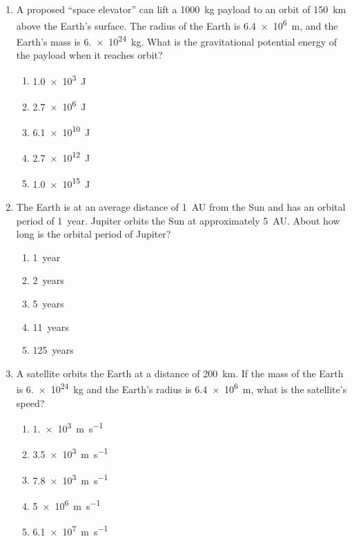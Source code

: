 \documentclass{../../oss-apphys}
\begin{document}
\begin{multicols}{2}
\begin{enumerate}[leftmargin=18pt]
    \columnbreak
    
  \item A proposed ``space elevator'' can lift a \SI{1000}{\kilo\gram} payload
    to an orbit of \SI{150}{\kilo\metre} above the Earth's surface. The radius
    of the Earth is \SI{6.4e6}{\metre}, and the Earth's mass is
    \SI{6.e24}{\kilo\gram}. What is the gravitational potential energy of the
    payload when it reaches orbit?
    \begin{enumerate}[noitemsep,topsep=0pt,leftmargin=18pt,label=(\Alph*)]
    \item\SI{1.0e3}{\joule}
    \item\SI{2.7e6}{\joule}
    \item\SI{6.1e10}{\joule}
    \item\SI{2.7e12}{\joule}
    \item\SI{1.0e15}{\joule}
    \end{enumerate}

  \item The Earth is at an average distance of \SI{1}{AU} from the Sun and has
    an orbital period of \SI{1}{year}. Jupiter orbits the Sun at approximately
    \SI{5}{AU}. About how long is the orbital period of Jupiter?
    \begin{enumerate}[noitemsep,topsep=0pt,leftmargin=18pt,label=(\Alph*)]
    \item\SI{1}{year}
    \item\SI{2}{years}
    \item\SI{5}{years}
    \item\SI{11}{years}
    \item\SI{125}{years}
    \end{enumerate}

  \item A satellite orbits the Earth at a distance of \SI{200}{\km}. If the mass
    of the Earth is \SI{6.e24}{\kilo\gram} and the Earth's radius is
    \SI{6.4e6}{\metre}, what is the satellite's speed?
    \begin{enumerate}[noitemsep,topsep=0pt,leftmargin=18pt,label=(\Alph*)]
    \item\SI{1.e3}{\metre\per\second}
    \item\SI{3.5e3}{\metre\per\second}
    \item\SI{7.8e3}{\metre\per\second}
    \item\SI{5e6}{\metre\per\second}
    \item\SI{6.1e7}{\metre\per\second}
    \end{enumerate}


\end{enumerate}
\end{multicols}
\end{document}
